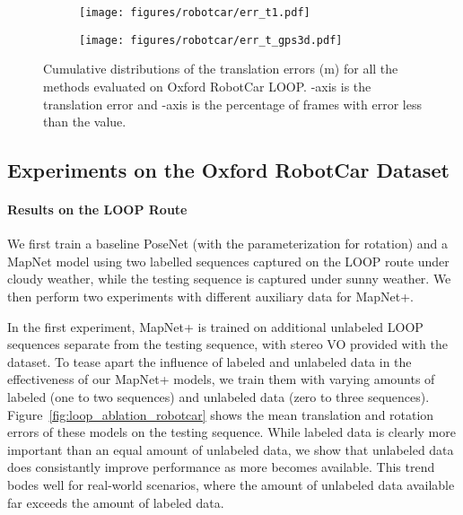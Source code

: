  
\begin{figure}
    \centering
    \begin{subfigure}{0.48\linewidth}
        \centering
        \texttt{[image: figures/robotcar/err\_t1.pdf]}
    \end{subfigure}
    \hfill
    \begin{subfigure}{0.48\linewidth}
        \centering
        \texttt{[image: figures/robotcar/err\_t\_gps3d.pdf]}
    \end{subfigure}
    \vspace{-1em} 
    \caption{\small Cumulative distributions of the translation errors (m) for all the methods 
    evaluated on Oxford RobotCar LOOP. -axis is the translation error and -axis is the percentage of frames with error less than
    the value.} 
    \label{fig:res_err_robotcar}
\end{figure}


\subsection{Experiments on the Oxford RobotCar Dataset}

\paragraph{Results on the LOOP Route}
We first train a baseline PoseNet (with the  parameterization for rotation) and a MapNet model using 
two labelled sequences captured on the LOOP route under cloudy weather,
while the testing sequence is captured under sunny weather. We then perform two experiments with different auxiliary data for MapNet+.

In the first experiment, MapNet+ is trained on additional unlabeled LOOP sequences separate from the testing sequence,
with stereo VO provided with the dataset. To tease apart the influence of labeled and unlabeled data in the effectiveness of our MapNet+ models,
we train them with varying amounts of labeled (one to two sequences)
and unlabeled data (zero to three sequences). Figure~\ref{fig:loop_ablation_robotcar} shows the mean
translation and rotation errors of these models on the testing sequence.
While labeled data is clearly more important than an equal amount of unlabeled data,
we show that unlabeled data does consistantly improve performance as more becomes available. This trend bodes well
for real-world scenarios, where the amount of unlabeled data available far exceeds the amount of labeled data.

